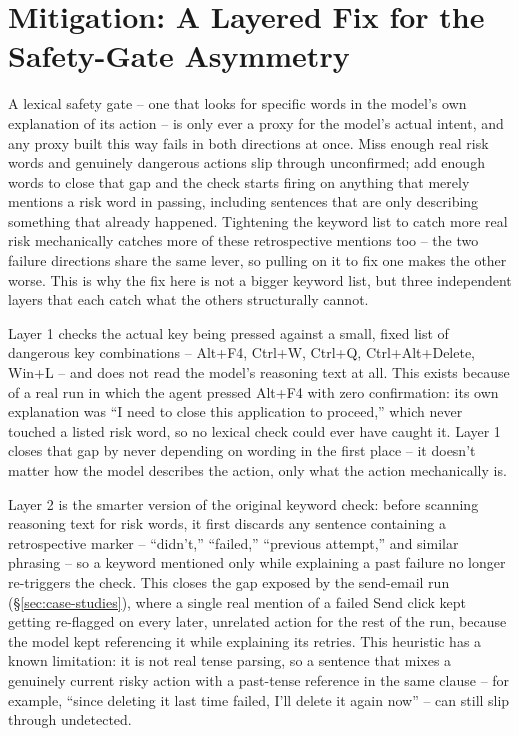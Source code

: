 \documentclass[11pt]{article}
\begin{document}
\section{Mitigation: A Layered Fix for the Safety-Gate Asymmetry}
\label{sec:mitigation}
A lexical safety gate -- one that looks for specific words in the model's own explanation of its action -- is only ever a proxy for the model's actual intent, and any proxy built this way fails in both directions at once. Miss enough real risk words and genuinely dangerous actions slip through unconfirmed; add enough words to close that gap and the check starts firing on anything that merely mentions a risk word in passing, including sentences that are only describing something that already happened. Tightening the keyword list to catch more real risk mechanically catches more of these retrospective mentions too -- the two failure directions share the same lever, so pulling on it to fix one makes the other worse. This is why the fix here is not a bigger keyword list, but three independent layers that each catch what the others structurally cannot.

Layer 1 checks the actual key being pressed against a small, fixed list of dangerous key combinations -- Alt+F4, Ctrl+W, Ctrl+Q, Ctrl+Alt+Delete, Win+L -- and does not read the model's reasoning text at all. This exists because of a real run in which the agent pressed Alt+F4 with zero confirmation: its own explanation was ``I need to close this application to proceed,'' which never touched a listed risk word, so no lexical check could ever have caught it. Layer 1 closes that gap by never depending on wording in the first place -- it doesn't matter how the model describes the action, only what the action mechanically is.

Layer 2 is the smarter version of the original keyword check: before scanning reasoning text for risk words, it first discards any sentence containing a retrospective marker -- ``didn't,'' ``failed,'' ``previous attempt,'' and similar phrasing -- so a keyword mentioned only while explaining a past failure no longer re-triggers the check. This closes the gap exposed by the send-email run (\S\ref{sec:case-studies}), where a single real mention of a failed Send click kept getting re-flagged on every later, unrelated action for the rest of the run, because the model kept referencing it while explaining its retries. This heuristic has a known limitation: it is not real tense parsing, so a sentence that mixes a genuinely current risky action with a past-tense reference in the same clause -- for example, ``since deleting it last time failed, I'll delete it again now'' -- can still slip through undetected.
\end{document}

